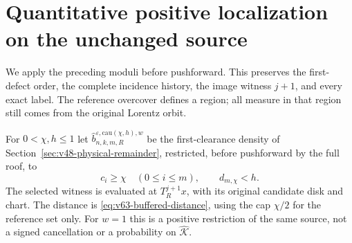 \section{Quantitative positive localization on the unchanged source}
\label{sec:v63-positive-localization}
We apply the preceding moduli before pushforward. This preserves the
first-defect order, the complete incidence history, the image witness
$j+1$, and every exact label. The reference overcover defines a region;
all measure in that region still comes from the original Lorentz orbit.

For $0<\chi,h\le1$ let
$\widehat b^{\varepsilon,\mathrm{cau}(\chi,h),w}_{n,k,m,R}$ be the
first-clearance density of Section~\ref{sec:v48-physical-remainder},
restricted, before pushforward by the full roof, to
\begin{equation}\label{eq:v63-retained-source}
 c_i\ge\chi\quad(0\le i\le m),\qquad
 d_{m,\chi}<h.
\end{equation}
The selected witness is evaluated at $T_R^{j+1}x$, with its original
candidate disk and chart. The distance is
\eqref{eq:v63-buffered-distance}, using the cap $\chi/2$ for the
reference set only. For $w=1$ this is a positive restriction of the
same source, not a signed cancellation or a probability on
$\widehat{\mathcal K}$.

